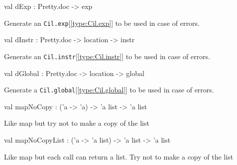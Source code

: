 \documentclass[11pt]{article}
\begin{document}
\label{val:Cil.dExp}\begin{ocamldoccode}
val dExp : Pretty.doc -> exp
\end{ocamldoccode}
\begin{ocamldocdescription}
Generate an {\tt{Cil.exp}}[\ref{type:Cil.exp}] to be used in case of errors.


\end{ocamldocdescription}




\label{val:Cil.dInstr}\begin{ocamldoccode}
val dInstr : Pretty.doc -> location -> instr
\end{ocamldoccode}
\begin{ocamldocdescription}
Generate an {\tt{Cil.instr}}[\ref{type:Cil.instr}] to be used in case of errors.


\end{ocamldocdescription}




\label{val:Cil.dGlobal}\begin{ocamldoccode}
val dGlobal : Pretty.doc -> location -> global
\end{ocamldoccode}
\begin{ocamldocdescription}
Generate a {\tt{Cil.global}}[\ref{type:Cil.global}] to be used in case of errors.


\end{ocamldocdescription}




\label{val:Cil.mapNoCopy}\begin{ocamldoccode}
val mapNoCopy : ('a -> 'a) -> 'a list -> 'a list
\end{ocamldoccode}
\begin{ocamldocdescription}
Like map but try not to make a copy of the list


\end{ocamldocdescription}




\label{val:Cil.mapNoCopyList}\begin{ocamldoccode}
val mapNoCopyList : ('a -> 'a list) -> 'a list -> 'a list
\end{ocamldoccode}
\begin{ocamldocdescription}
Like map but each call can return a list. Try not to make a copy of the 
    list


\end{ocamldocdescription}
\end{document}
